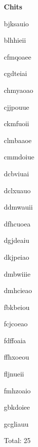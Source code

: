 \documentclass[conference]{IEEEtran}
\begin{document}
\clearpage

\textbf{Chits}

bjksauio

blhhieii

cfmqoaee

cgdteiai

chmyaoao

cjjpouue

ckmfuoii

clmbaaoe

cmmdoiue

dcbviuai

dclxuauo

ddmwauii

dfhcuoea

dgjdeaiu

dkjpeiao

dmbwiiie

dmhcieao

fbkbeiou

fcjcoeao

fdffoaia

ffhxoeou

fljnueii

fmhzoaio

gbkdoiee

gcgliauu

Total: 25
\end{document}
